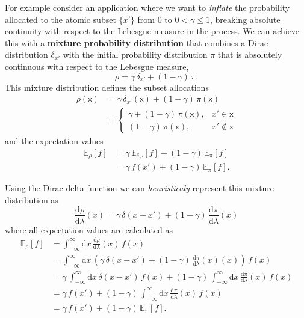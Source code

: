 \documentclass[
  letterpaper,
  DIV=11,
  numbers=noendperiod]{scrartcl}
\begin{document}
For example consider an application where we want to \emph{inflate} the
probability allocated to the atomic subset \(\{ x' \}\) from \(0\) to
\(0 < \gamma \le 1\), breaking absolute continuity with respect to the
Lebesgue measure in the process. We can achieve this with a
\textbf{mixture probability distribution} that combines a Dirac
distribution \(\delta_{x'}\) with the initial probability distribution
\(\pi\) that is absolutely continuous with respect to the Lebesgue
measure, \[
\rho = \gamma \, \delta_{x'} + (1 - \gamma) \, \pi.
\] This mixture distribution defines the subset allocations
\begin{align*}
\rho(\mathsf{x})
&=
  \gamma \, \delta_{x'}(\mathsf{x})
+ (1 - \gamma) \, \pi(\mathsf{x})
\\
&=
\left\{
\begin{array}{rr}
\gamma + (1 - \gamma) \, \pi(\mathsf{x}), & x' \in \mathsf{x} \\
(1 - \gamma) \, \pi(\mathsf{x}), & x' \notin \mathsf{x}
\end{array}
\right.
\end{align*} and the expectation values \begin{align*}
\mathbb{E}_{\rho}[f]
&=
  \gamma \, \mathbb{E}_{\delta_{x'}}[f]
+ (1 - \gamma) \, \mathbb{E}_{\pi}[f]
\\
&=
\gamma \, f(x') + (1 - \gamma) \, \mathbb{E}_{\pi}[f].
\end{align*}

Using the Dirac delta function we can \emph{heuristicaly} represent this
mixture distribution as \[
\frac{\mathrm{d} \rho}{\mathrm{d} \lambda}(x)
=   \gamma \, \delta(x - x')
  + (1 - \gamma) \, \frac{\mathrm{d} \pi}{\mathrm{d} \lambda}(x)
\] where all expectation values are calculated as \begin{align*}
\mathbb{E}_{\rho}[f]
&=
\int_{-\infty}^{\infty} \mathrm{d} x \,
\frac{\mathrm{d} \rho}{\mathrm{d} \lambda}(x) \, f(x)
\\
&=
\int_{-\infty}^{\infty} \mathrm{d} x \,
\left( \gamma \, \delta(x - x') +
       (1 - \gamma) \, \frac{\mathrm{d} \pi}{\mathrm{d} \lambda}(x)(x)
\right) \, f(x)
\\
&=
\gamma \, \int_{-\infty}^{\infty} \mathrm{d} x \, \delta(x - x') \, f(x)
+ (1 - \gamma) \,
\int_{-\infty}^{\infty} \mathrm{d} x \,
\frac{\mathrm{d} \pi}{\mathrm{d} \lambda}(x) \, f(x)
\\
&=
\gamma \, f(x')
+ (1 - \gamma) \,
\int_{-\infty}^{\infty} \mathrm{d} x \,
\frac{\mathrm{d} \pi}{\mathrm{d} \lambda}(x) \, f(x)
\\
&=
\gamma \, f(x') + (1 - \gamma) \, \mathbb{E}_{\pi}[f].
\end{align*}
\end{document}
